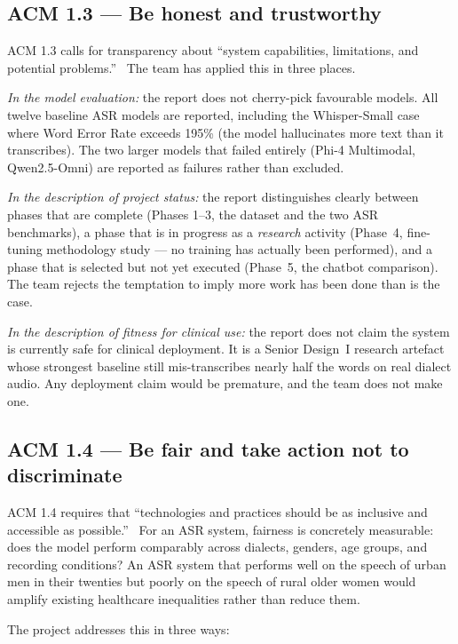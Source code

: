 \documentclass[12pt,a4paper]{article}
\begin{document}
\subsection{ACM 1.3 --- Be honest and trustworthy}

ACM 1.3 calls for transparency about ``system capabilities,
limitations, and potential problems.''~\cite{eth:acm2018} The team
has applied this in three places.

\textit{In the model evaluation:} the report does not cherry-pick
favourable models. All twelve baseline ASR models are reported,
including the Whisper-Small case where Word Error Rate exceeds
195\% (the model hallucinates more text than it transcribes). The
two larger models that failed entirely (Phi-4 Multimodal,
Qwen2.5-Omni) are reported as failures rather than excluded.

\textit{In the description of project status:} the report
distinguishes clearly between phases that are complete (Phases 1--3,
the dataset and the two ASR benchmarks), a phase that is in progress
as a \emph{research} activity (Phase~4, fine-tuning methodology
study --- no training has actually been performed), and a phase that
is selected but not yet executed (Phase~5, the chatbot comparison).
The team rejects the temptation to imply more work has been done
than is the case.

\textit{In the description of fitness for clinical use:} the
report does not claim the system is currently safe for clinical
deployment. It is a Senior Design~I research artefact whose
strongest baseline still mis-transcribes nearly half the words on
real dialect audio. Any deployment claim would be premature, and
the team does not make one.

\subsection{ACM 1.4 --- Be fair and take action not to discriminate}

ACM 1.4 requires that ``technologies and practices should be as
inclusive and accessible as possible.''~\cite{eth:acm2018} For an
ASR system, fairness is concretely measurable: does the model
perform comparably across dialects, genders, age groups, and
recording conditions? An ASR system that performs well on the speech
of urban men in their twenties but poorly on the speech of rural
older women would amplify existing healthcare inequalities rather
than reduce them.

The project addresses this in three ways:
\end{document}
